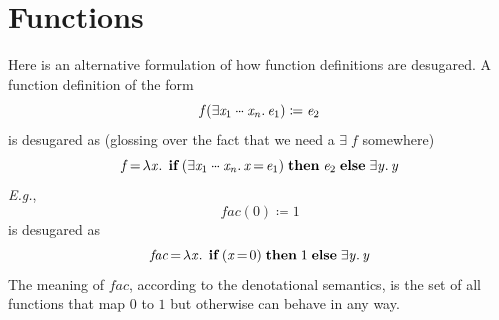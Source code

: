 \documentclass[acmsmall,review,dvipsnames]{acmart}
\newcommand{\Varid}[1]{\mathit{#1}}
\newcommand{\Eg}{\emph{E.g.}}
\newcommand\mydots{\makebox[0.55em][c]{\text{$\cdot\hspace{-0.3em}\cdot\hspace{-0.3em}\cdot$}}}
\begin{document}
\section{Functions}
Here is an alternative formulation of how function definitions are desugared.
A function definition of the form
$$
\ensuremath{\Varid{f}(\exists\Varid{x}_{\mathrm{1}}\;\mydots\;\Varid{x}_{\Varid{n}}.\,\Varid{e}_{\mathrm{1}})\mathrel{\coloneqq}\Varid{e}_{\mathrm{2}}}
$$
is desugared as (glossing over the fact that we need a \ensuremath{\exists{}\;\Varid{f}} somewhere)
$$
\ensuremath{\Varid{f}\hspace{-0.14em}=\hspace{-0.14em}\lambda\Varid{x}.\,\;\textbf{if}\;(\exists\Varid{x}_{\mathrm{1}}\;\mydots\;\Varid{x}_{\Varid{n}}.\,\Varid{x}\hspace{-0.14em}=\hspace{-0.14em}\Varid{e}_{\mathrm{1}})\;\textbf{then}\;\Varid{e}_{\mathrm{2}}\;\textbf{else}\;\exists\Varid{y}.\,\Varid{y}}
$$
\Eg,
$$
\ensuremath{\Varid{fac}(\mathrm{0})\mathrel{\coloneqq}\mathrm{1}}
$$
is desugared as
$$
\ensuremath{\Varid{fac}\hspace{-0.14em}=\hspace{-0.14em}\lambda\Varid{x}.\,\;\textbf{if}\;(\Varid{x}\hspace{-0.14em}=\hspace{-0.14em}\mathrm{0})\;\textbf{then}\;\mathrm{1}\;\textbf{else}\;\exists\Varid{y}.\,\Varid{y}}
$$
The meaning of \ensuremath{\Varid{fac}}, according to the denotational semantics,
is the set of all functions that map \ensuremath{\mathrm{0}} to \ensuremath{\mathrm{1}} but otherwise can behave in any way.
\end{document}
